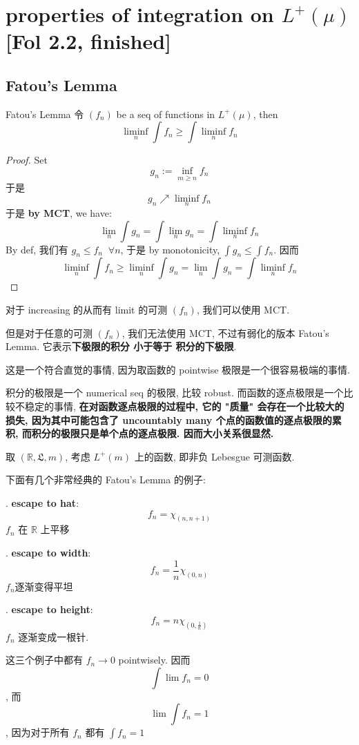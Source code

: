 \documentclass[lang=cn,11pt]{elegantbook}
\begin{document}
\chapter{properties of integration on $L^+(\mu)$ [Fol 2.2, finished]}
\section{Fatou's Lemma}
\begin{theorem}{Fatou's Lemma}
    \label{Fatou's Lemma}
 令 $(f_n)$ be a seq of functions in $L^+(\mu)$, then $$ \liminf_n \int f_n \geq \int \liminf_n f_n$$
\end{theorem}

\begin{proof}
    Set \[g_n := \inf_{m \geq n }     f_n   \]于是 \[g_n \nearrow \liminf_n f_n\]
于是\textbf{ by MCT}, we have: \[  \lim_n \int g_n =  \int \lim_n g_n =      \int \liminf_n f_n  \]
By def, 我们有 $g_n \leq f_n \;\;\forall n$, 于是 by monotonicity, $\int g_n \leq \int f_n$. 因而 \[  \liminf_n \int f_n \geq \liminf_n \int g_n  = \lim_n \int g_n = \int \liminf_n f_n   \]
\end{proof}
\begin{remark}
    对于 increasing 的从而有 limit 的可测 $(f_n)$, 我们可以使用 MCT.

    但是对于任意的可测 $(f_n)$, 我们无法使用 MCT, 不过有弱化的版本 Fatou's Lemma. 它表示\textbf{下极限的积分 小于等于 积分的下极限}.

    这是一个符合直觉的事情, 因为取函数的 pointwise 极限是一个很容易极端的事情. 
    
    积分的极限是一个 numerical seq 的极限, 比较 robust. 而函数的逐点极限是一个比较不稳定的事情, \textbf{在对函数逐点极限的过程中, 它的 "质量" 会存在一个比较大的损失, 因为其中可能包含了 uncountably many 个点的函数值的逐点极限的累积, 而积分的极限只是单个点的逐点极限. 因而大小关系很显然. }
\end{remark}


\begin{example}
    取 $(\mathbb{R},\mathfrak{L}, m)$, 考虑 $L^+(m)$ 上的函数, 即非负 Lebesgue 可测函数.

    下面有几个非常经典的 Fatou's Lemma 的例子:

. \textbf{escape to hat}: \[f_n = \chi_{(n,n+1)}\]
$f_n$ 在 $\mathbb{R}$ 上平移

   . \textbf{escape to width}: \[f_n = \frac{1}{n}  \chi_{(0,n)}\]
    $f_n$逐渐变得平坦
    
 . \textbf{escape to height}: \[ f_n = n \chi_{(0,\frac{1}{n})}\]
$f_n$ 逐渐变成一根针.

这三个例子中都有 $f_n \rightarrow 0$ pointwisely. 因而 $$\int \lim f_n = 0$$, 而 $$\lim \int f_n = 1$$, 因为对于所有 $f_n$ 都有 $\int f_n = 1$
\end{example}
\end{document}
